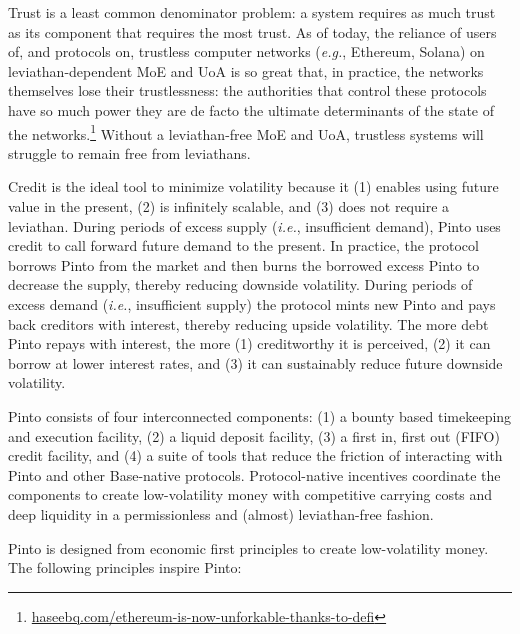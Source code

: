 \documentclass[tikz]{article}
\newcommand{\fref}[1]{\footnote{\href{http://#1}{#1}}}
\begin{document}
Trust is a least common denominator problem: a system requires as much trust as its component that requires the most trust. As of today, the reliance of users of, and protocols on, trustless computer networks (\textit{e.g.}, Ethereum, Solana) on leviathan-dependent MoE and UoA is so great that, in practice, the networks themselves lose their trustlessness: the authorities that control these protocols have so much power they are de facto the ultimate determinants of the state of the networks.\fref{haseebq.com/ethereum-is-now-unforkable-thanks-to-defi} Without a leviathan-free MoE and UoA, trustless systems will struggle to remain free from leviathans.

\vspace*{-0.1cm}

Credit is the ideal tool to minimize volatility because it (1) enables using future value in the present, (2) is infinitely scalable, and (3) does not require a leviathan. During periods of excess supply (\textit{i.e.}, insufficient demand), Pinto uses credit to call forward future demand to the present. In practice, the protocol borrows Pinto from the market and then burns the borrowed excess Pinto to decrease the supply, thereby reducing downside volatility. During periods of excess demand (\textit{i.e.}, insufficient supply) the protocol mints new Pinto and pays back creditors with interest, thereby reducing upside volatility. The more debt Pinto repays with interest, the more (1) creditworthy it is perceived, (2) it can borrow at lower interest rates, and (3) it can sustainably reduce future downside volatility. 

\vspace*{-0.1cm}

Pinto consists of four interconnected components: (1) a bounty based timekeeping and execution facility, (2) a liquid deposit facility, (3) a first in, first out (FIFO) credit facility, and (4) a suite of tools that reduce the friction of interacting with Pinto and other Base-native protocols. Protocol-native incentives coordinate the components to create low-volatility money with competitive carrying costs and deep liquidity in a permissionless and (almost) leviathan-free fashion.

\vspace*{-0.1cm}

Pinto is designed from economic first principles to create low-volatility money. The following principles inspire Pinto:

\vspace*{-0.3cm}
\end{document}
